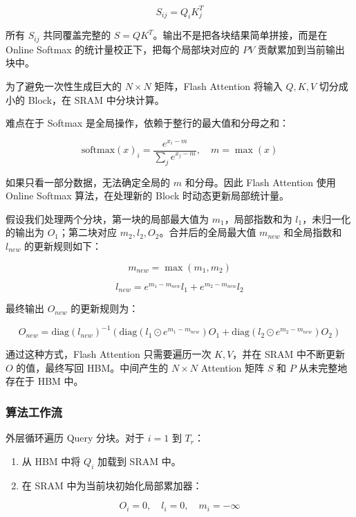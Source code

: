 \[
S_{ij} = Q_iK_j^T
\]

所有 \(S_{ij}\) 共同覆盖完整的 \(S = QK^T\)。输出不是把各块结果简单拼接，而是在 Online Softmax 的统计量校正下，把每个局部块对应的 \(PV\) 贡献累加到当前输出块中。

为了避免一次性生成巨大的 \(N \times N\) 矩阵，Flash Attention 将输入 \(Q,K,V\) 切分成小的 Block，在 SRAM 中分块计算。

难点在于 Softmax 是全局操作，依赖于整行的最大值和分母之和：

\[
\mathrm{softmax}(x)_i = \frac{e^{x_i-m}}{\sum_j e^{x_j-m}},\quad m = \max(x)
\]

如果只看一部分数据，无法确定全局的 \(m\) 和分母。因此 Flash Attention 使用 Online Softmax 算法，在处理新的 Block 时动态更新局部统计量。

假设我们处理两个分块，第一块的局部最大值为 \(m_1\)，局部指数和为 \(l_1\)，未归一化的输出为 \(O_1\)；第二块对应 \(m_2,l_2,O_2\)。合并后的全局最大值 \(m_{new}\) 和全局指数和 \(l_{new}\) 的更新规则如下：

\[
m_{new} = \max(m_1,m_2)
\]

\[
l_{new} = e^{m_1-m_{new}}l_1 + e^{m_2-m_{new}}l_2
\]

最终输出 \(O_{new}\) 的更新规则为：

\[
O_{new} = \mathrm{diag}(l_{new})^{-1}\left(\mathrm{diag}\left(l_1 \odot e^{m_1-m_{new}}\right)O_1 + \mathrm{diag}\left(l_2 \odot e^{m_2-m_{new}}\right)O_2\right)
\]

通过这种方式，Flash Attention 只需要遍历一次 \(K,V\)，并在 SRAM 中不断更新 \(O\) 的值，最终写回 HBM。中间产生的 \(N \times N\) Attention 矩阵 \(S\) 和 \(P\) 从未完整地存在于 HBM 中。

\hypertarget{ux7b97ux6cd5ux5de5ux4f5cux6d41}{%
\subsubsection{算法工作流}\label{ux7b97ux6cd5ux5de5ux4f5cux6d41}}

外层循环遍历 Query 分块。对于 \(i = 1\) 到 \(T_r\)：

\begin{enumerate}
\def\labelenumi{\arabic{enumi}.}
\tightlist
\item
  从 HBM 中将 \(Q_i\) 加载到 SRAM 中。
\item
  在 SRAM 中为当前块初始化局部累加器：
\end{enumerate}

\[
O_i = 0,\quad l_i = 0,\quad m_i = -\infty
\]

